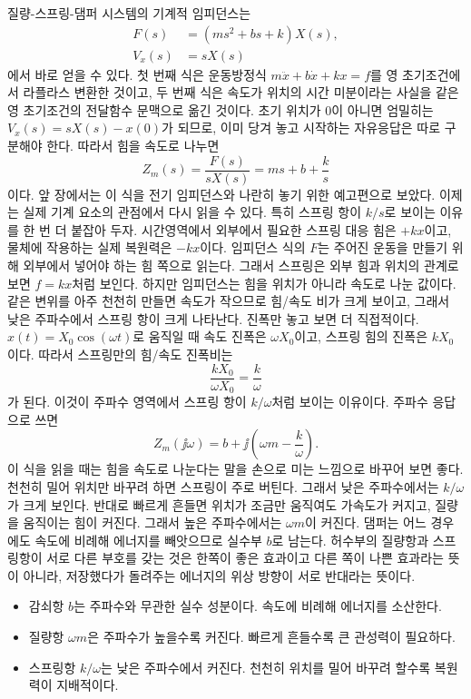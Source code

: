 질량-스프링-댐퍼 시스템의 기계적 임피던스는
\begin{align}
  F(s)
  &=
  \left(ms^2+bs+k\right)X(s), \\
  V_x(s)
  &=
  sX(s)
\end{align}
에서 바로 얻을 수 있다.
첫 번째 식은 운동방정식 $m\ddot{x}+b\dot{x}+kx=f$를 영 초기조건에서 라플라스 변환한 것이고, 두 번째 식은 속도가 위치의 시간 미분이라는 사실을 같은 영 초기조건의 전달함수 문맥으로 옮긴 것이다.
초기 위치가 0이 아니면 엄밀히는 $V_x(s)=sX(s)-x(0)$가 되므로, 이미 당겨 놓고 시작하는 자유응답은 따로 구분해야 한다.
따라서 힘을 속도로 나누면
\begin{equation}
  Z_m(s)=\frac{F(s)}{sX(s)}
  =
  ms+b+\frac{k}{s}
\end{equation}
이다.
앞 장에서는 이 식을 전기 임피던스와 나란히 놓기 위한 예고편으로 보았다.
이제는 실제 기계 요소의 관점에서 다시 읽을 수 있다.
특히 스프링 항이 $k/s$로 보이는 이유를 한 번 더 붙잡아 두자.
시간영역에서 외부에서 필요한 스프링 대응 힘은 $+kx$이고, 물체에 작용하는 실제 복원력은 $-kx$이다.
임피던스 식의 $F$는 주어진 운동을 만들기 위해 외부에서 넣어야 하는 힘 쪽으로 읽는다.
그래서 스프링은 외부 힘과 위치의 관계로 보면 $f=kx$처럼 보인다.
하지만 임피던스는 힘을 위치가 아니라 속도로 나눈 값이다.
같은 변위를 아주 천천히 만들면 속도가 작으므로 힘/속도 비가 크게 보이고, 그래서 낮은 주파수에서 스프링 항이 크게 나타난다.
진폭만 놓고 보면 더 직접적이다.
$x(t)=X_0\cos(\omega t)$로 움직일 때 속도 진폭은 $\omega X_0$이고, 스프링 힘의 진폭은 $kX_0$이다.
따라서 스프링만의 힘/속도 진폭비는
\begin{equation}
  \frac{kX_0}{\omega X_0}=\frac{k}{\omega}
\end{equation}
가 된다.
이것이 주파수 영역에서 스프링 항이 $k/\omega$처럼 보이는 이유이다.
주파수 응답으로 쓰면
\begin{equation}
  Z_m(\jj\omega)
  =
  b+\jj\left(\omega m-\frac{k}{\omega}\right).
\end{equation}
이 식을 읽을 때는 힘을 속도로 나눈다는 말을 손으로 미는 느낌으로 바꾸어 보면 좋다.
천천히 밀어 위치만 바꾸려 하면 스프링이 주로 버틴다.
그래서 낮은 주파수에서는 $k/\omega$가 크게 보인다.
반대로 빠르게 흔들면 위치가 조금만 움직여도 가속도가 커지고, 질량을 움직이는 힘이 커진다.
그래서 높은 주파수에서는 $\omega m$이 커진다.
댐퍼는 어느 경우에도 속도에 비례해 에너지를 빼앗으므로 실수부 $b$로 남는다.
허수부의 질량항과 스프링항이 서로 다른 부호를 갖는 것은 한쪽이 좋은 효과이고 다른 쪽이 나쁜 효과라는 뜻이 아니라, 저장했다가 돌려주는 에너지의 위상 방향이 서로 반대라는 뜻이다.
\begin{itemize}
  \item 감쇠항 $b$는 주파수와 무관한 실수 성분이다. 속도에 비례해 에너지를 소산한다.
  \item 질량항 $\omega m$은 주파수가 높을수록 커진다. 빠르게 흔들수록 큰 관성력이 필요하다.
  \item 스프링항 $k/\omega$는 낮은 주파수에서 커진다. 천천히 위치를 밀어 바꾸려 할수록 복원력이 지배적이다.
\end{itemize}
